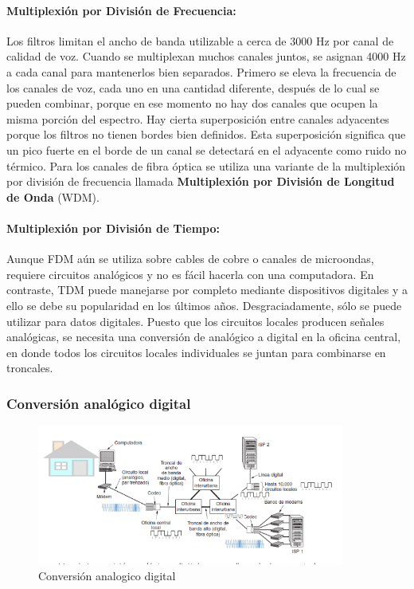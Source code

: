 \paragraph{Multiplexión por División de Frecuencia:} Los filtros limitan el ancho de banda utilizable a cerca de 3000 Hz por canal de calidad de voz. Cuando se multiplexan muchos canales juntos, se asignan 4000 Hz a cada canal para mantenerlos bien separados. Primero se eleva la frecuencia de los canales de voz, cada uno en una cantidad diferente, después de lo cual se pueden combinar, porque en ese momento no hay dos canales que ocupen la misma porción del espectro. Hay cierta superposición entre canales adyacentes porque los filtros no tienen bordes bien definidos. Esta superposición significa que un pico fuerte en el borde de un canal se detectará en el adyacente como ruido no térmico. Para los canales de fibra óptica se utiliza una variante de la multiplexión por división de frecuencia llamada \textbf{Multiplexión por División de Longitud de Onda} (WDM).

\paragraph{Multiplexión por División de Tiempo:} Aunque FDM aún se utiliza sobre cables de cobre o canales de microondas, requiere circuitos analógicos y no es fácil hacerla con una computadora. En contraste, TDM puede manejarse por completo mediante dispositivos digitales y a ello se debe su popularidad en los últimos años. Desgraciadamente, sólo se puede utilizar para datos digitales. Puesto que los circuitos locales producen señales analógicas, se necesita una conversión de analógico a digital en la oficina central, en donde todos los circuitos locales individuales se juntan para combinarse en troncales.

\subsubsection{Conversión analógico digital}
\begin{figure}[H]
	\centering
	\includegraphics[width=0.9\textwidth
]{images/conversion-analogico-digital.png}
	\caption[Conversión analogico digital]{Conversión analogico digital}
	\label{fig:conversion-analogico-digital}
\end{figure}
